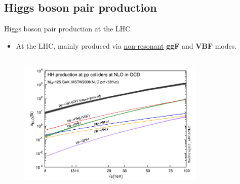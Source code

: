\subsection{Higgs boson pair production}

\begin{frame}{Higgs boson pair production at the LHC}

\begin{itemize}
    \item At the LHC, mainly produced via \underline{non-resonant} \textbf{\textcolor{HHred}{ggF}} and \textbf{\textcolor{HHturquoise_d}{VBF}} modes. 
\end{itemize}

\begin{figure}
\end{figure}

\begin{columns}
\begin{figure}
    \centering
    \includegraphics[width=0.8\textwidth]{Part1/Img/HH_XSec_as_S.png}
\end{figure}


\end{columns}
\end{frame}
